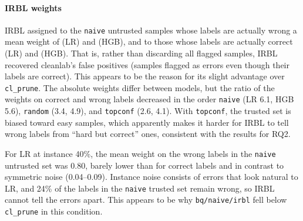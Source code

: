\documentclass[a4paper,10pt]{article}
\newcommand{\method}[1]{\texttt{#1}}
\newcommand{\cl}{\textsf{cleanlab}}
\begin{document}
\paragraph{IRBL weights}
IRBL assigned to the \method{naive} untrusted samples whose labels are actually wrong a mean weight of \MechLRWNoisy{} (LR) and \MechHGBWNoisy{} (HGB), and to those whose labels are actually correct \MechLRWClean{} (LR) and \MechHGBWClean{} (HGB).
That is, rather than discarding all flagged samples, IRBL recovered \cl{}'s false positives (samples flagged as errors even though their labels are correct).
This appears to be the reason for its slight advantage over \method{cl\_prune}.
The absolute weights differ between models, but the ratio of the weights on correct and wrong labels decreased in the order \method{naive} (LR 6.1, HGB 5.6), \method{random} (3.4, 4.9), and \method{topconf} (2.6, 4.1).
With \method{topconf}, the trusted set is biased toward easy samples, which apparently makes it harder for IRBL to tell wrong labels from ``hard but correct'' ones, consistent with the results for RQ2.

For LR at instance 40\%, the mean weight on the wrong labels in the \method{naive} untrusted set was 0.80, barely lower than for correct labels and in contrast to symmetric noise (0.04--0.09).
Instance noise consists of errors that look natural to LR, and 24\% of the labels in the \method{naive} trusted set remain wrong, so IRBL cannot tell the errors apart.
This appears to be why \method{bq/naive/irbl} fell below \method{cl\_prune} in this condition.

\begin{table}[tbp]
  \centering
  \caption{Mean diagonal of the transition matrix estimated by GLC (\texttt{gold}) and the fraction of correct labels in the untrusted set (mean over 3 datasets $\times$ 5 seeds). True is the unweighted average over classes of the diagonal of the true transition matrix of the whole dataset, $\frac{1}{K}\sum_{k} T_{kk}$. Under instance noise, flips concentrate on error-prone classes, so it does not match the sample-level noise rate $\rho$.}
  \label{tab:mech-glc}
  \scriptsize
  \setlength{\tabcolsep}{3.5pt}
  
\end{table}

\begin{table}[tbp]
  \centering
  \caption{Mean weights assigned by IRBL to untrusted samples (mean over 3 datasets $\times$ 5 seeds). Noisy and Clean denote untrusted samples whose labels are actually wrong and correct, respectively.}
  \label{tab:mech-irbl}
  \footnotesize
  
\end{table}
\end{document}
